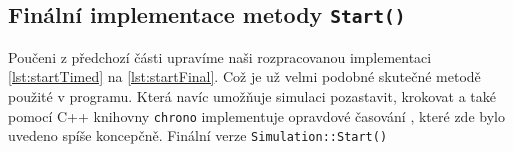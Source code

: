 \subsection{Finální implementace metody \texttt{Start()}}
Poučeni z předchozí části upravíme naši rozpracovanou implementaci \ref{lst:startTimed} na \ref{lst:startFinal}. Což je už velmi podobné skutečné metodě použité v programu. Která navíc umožňuje simulaci pozastavit, krokovat a také pomocí C++ knihovny \texttt{chrono} implementuje opravdové časování , které zde bylo uvedeno spíše koncepčně.
{Finální verze \texttt{Simulation::Start()}}

